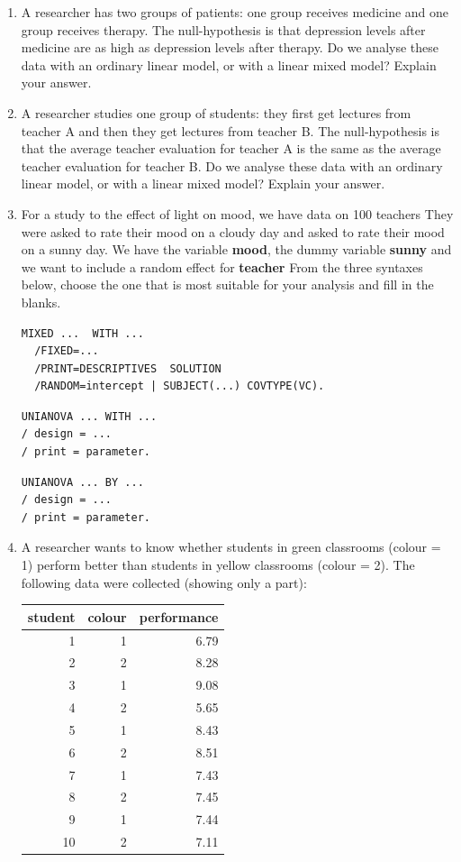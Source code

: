 \documentclass[]{report}\usepackage[]{graphicx}\usepackage[]{color}
\newenvironment{knitrout}{}{} %
\begin{document}
\begin{enumerate}
\item A researcher has two groups of patients: one group receives medicine and one group receives therapy. The null-hypothesis is that depression levels after medicine are as high as depression levels after therapy. Do we analyse these data with an ordinary linear model, or with a linear mixed model? Explain your answer.

\item  A researcher studies one group of students: they first get lectures from teacher A and then they get lectures from teacher B. The null-hypothesis is that the average teacher evaluation for teacher A is the same as the average teacher evaluation for teacher B. Do we analyse these data with an ordinary linear model, or with a linear mixed model? Explain your answer. 


\item  For a study to the effect of light on mood, we have data on 100 teachers They were asked to rate their mood on a cloudy day and asked to rate their mood on a sunny day. We have the variable \textbf{mood}, the dummy variable \textbf{sunny} and we want to include a random effect for \textbf{teacher} From the three syntaxes below, choose the one that is most suitable for your analysis and fill in the blanks.


\begin{verbatim}
MIXED ...  WITH ...
  /FIXED=...
  /PRINT=DESCRIPTIVES  SOLUTION
  /RANDOM=intercept | SUBJECT(...) COVTYPE(VC).
\end{verbatim}


\begin{verbatim}
UNIANOVA ... WITH ... 
/ design = ...
/ print = parameter.
\end{verbatim}


\begin{verbatim}
UNIANOVA ... BY ... 
/ design = ...
/ print = parameter.
\end{verbatim}


\item  A researcher wants to know whether students in green classrooms (colour = 1) perform better than students in yellow classrooms (colour = 2). The following data were collected (showing only a part):

\begin{knitrout}
\color{fgcolor}
\begin{tabular}{r|r|r}
\hline
student & colour & performance\\
\hline
1 & 1 & 6.79\\
\hline
2 & 2 & 8.28\\
\hline
3 & 1 & 9.08\\
\hline
4 & 2 & 5.65\\
\hline
5 & 1 & 8.43\\
\hline
6 & 2 & 8.51\\
\hline
7 & 1 & 7.43\\
\hline
8 & 2 & 7.45\\
\hline
9 & 1 & 7.44\\
\hline
10 & 2 & 7.11\\
\hline
\end{tabular}



\end{knitrout}
\end{enumerate}
\end{document}
